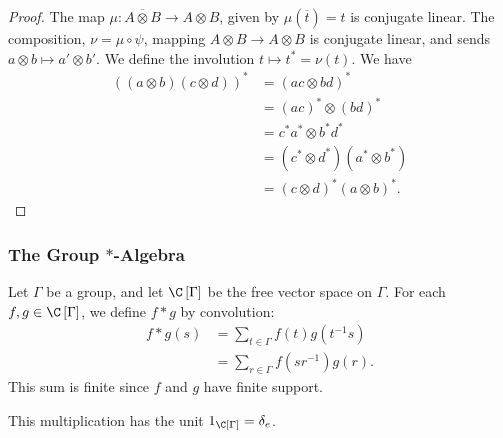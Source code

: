 \documentclass[10pt]{mypackage}
\begin{document}
\begin{proof}
  The map $\mu\colon \overline{A\otimes B} \rightarrow A\otimes B$, given by $\mu\left(\overline{t}\right) = t$ is conjugate linear. The composition, $\nu = \mu\circ \psi$, mapping $A\otimes B \rightarrow A\otimes B$ is conjugate linear, and sends $a\otimes b \mapsto a'\otimes b'$. We define the involution $t\mapsto t^{\ast}= \nu\left(t\right)$. We have
  \begin{align*}
    \left(\left(a\otimes b\right)\left(c\otimes d\right)\right)^{\ast} &= \left(ac\otimes bd\right)^{\ast}\\
                                                                       &= \left(ac\right)^{\ast}\otimes \left(bd\right)^{\ast}\\
                                                                       &= c^{\ast}a^{\ast}\otimes b^{\ast}d^{\ast}\\
                                                                       &= \left(c^{\ast}\otimes d^{\ast}\right)\left(a^{\ast}\otimes b^{\ast}\right)\\
                                                                       &= \left(c\otimes d \right)^{\ast}\left(a\otimes b\right)^{\ast}.
  \end{align*}
\end{proof}
\subsubsection{The Group $\ast$-Algebra}%
Let $\Gamma$ be a group, and let $\C\left[\Gamma\right]$ be the free vector space on $\Gamma$. For each $f,g\in \C\left[\Gamma\right]$, we define $f\ast g$ by convolution:
\begin{align*}
  f\ast g \left(s\right) &= \sum_{t\in \Gamma}f\left(t\right)g\left(t^{-1}s\right)\\
                           &= \sum_{r\in \Gamma}f\left(sr^{-1}\right)g\left(r\right).
\end{align*}
This sum is finite since $f$ and $g$ have finite support.\newline

This multiplication has the unit $1_{\C\left[\Gamma\right]} = \delta_{e}$.\newline
\end{document}
